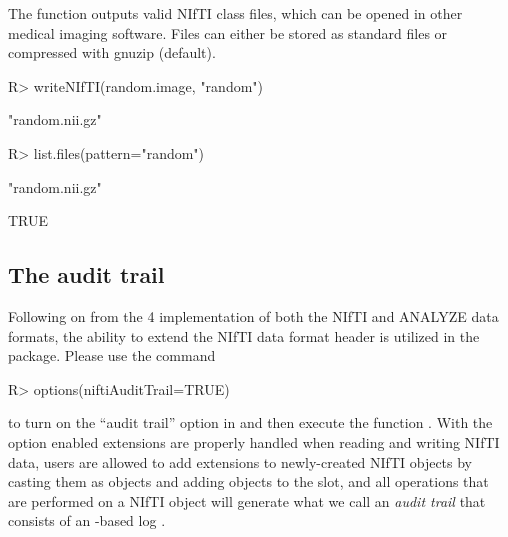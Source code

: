 \documentclass[
]{jss}
\begin{document}
The function  outputs valid NIfTI class files, which
can be opened in other medical imaging software. Files can either be
stored as standard  files or compressed with gnuzip
(default).

\begin{CodeChunk}

\begin{CodeInput}
R> writeNIfTI(random.image, "random")
\end{CodeInput}

\begin{CodeOutput}
[1] "random.nii.gz"
\end{CodeOutput}

\begin{CodeInput}
R> list.files(pattern="random")
\end{CodeInput}

\begin{CodeOutput}
[1] "random.nii.gz"
\end{CodeOutput}
\end{CodeChunk}

\begin{CodeChunk}

\begin{CodeOutput}
[1] TRUE
\end{CodeOutput}
\end{CodeChunk}

\subsection{The audit trail}

Following on from the 4 implementation of both the NIfTI and
ANALYZE data formats, the ability to extend the NIfTI data format header
is utilized in the  package. Please use the command

\begin{CodeChunk}

\begin{CodeInput}
R> options(niftiAuditTrail=TRUE)
\end{CodeInput}
\end{CodeChunk}

to turn on the ``audit trail'' option in  and then
execute the function . With the option enabled
extensions are properly handled when reading and writing NIfTI data,
users are allowed to add extensions to newly-created NIfTI objects by
casting them as  objects and adding
 objects to the  slot, and
all operations that are performed on a NIfTI object will generate what
we call an \emph{audit trail} that consists of an -based
log \citep{XML}.
\end{document}
